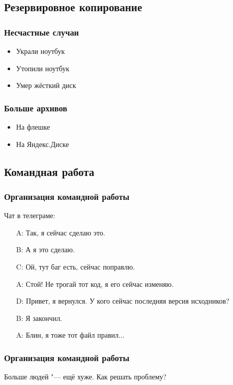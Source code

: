 \documentclass[pdf,russian]{beamer}
\begin{document}
\subsection{Резервировное копирование}

\begin{frame}[fragile]
    \frametitle{Несчастные случаи}
    \begin{itemize}
        \pause
        \item Украли ноутбук
        \pause
        \item Утопили ноутбук
        \pause
        \item Умер жёсткий диск
    \end{itemize}
\end{frame}

\begin{frame}[fragile]
    \frametitle{Больше архивов}
    \begin{itemize}
        \item На флешке
        \item На Яндекс.Диске
    \end{itemize}
\end{frame}

\subsection{Командная работа}

\begin{frame}[fragile]
    \frametitle{Организация командной работы}
    Чат в телеграме:
    \begin{itemize}
        \pause
        \item[A:] Так, я сейчас сделаю это.
        \pause
        \item[B:] А я это сделаю.
        \pause
        \item[C:] Ой, тут баг есть, сейчас поправлю.
        \pause
        \item[A:] Стой! Не трогай тот код, я его сейчас изменяю.
        \pause
        \item[D:] Привет, я вернулся. У кого сейчас последняя версия исходников?
        \pause
        \item[B:] Я закончил.
        \pause
        \item[A:] Блин, я тоже тот файл правил...
    \end{itemize}
\end{frame}

\begin{frame}[fragile]
    \frametitle{Организация командной работы}
    Больше людей "--- ещё хуже.
    \pause
    Как решать проблему?
\end{frame}
\end{document}
